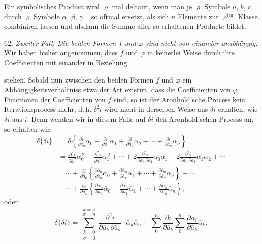 \documentclass[11pt]{article}
\providecommand{\weberpage}[1]{}
\begin{document}
\glqq Ein symbolisches Product wird $\varrho$ mal deltairt, wenn man je $\varrho$ Symbole $a$, $b$, $c\dots$ durch $\varrho$ Symbole $\alpha$, $\beta$, $\gamma\dots$ so oftmal ersetzt, als sich $n$ Elemente zur $\varrho^{\text{ten}}$ Klasse combiniren lassen und alsdann die Summe aller so erhaltenen Producte bildet.\grqq{}

62. \textit{Zweiter Fall: Die beiden Formen $f$ und $\varphi$ sind nicht von einander unabhängig.} Wir haben bisher angenommen, dass $f$ und $\varphi$ in keinerlei Weise durch ihre Coefficienten mit einander in Beziehung


\weberpage{67}
stehen. Sobald nun zwischen den beiden Formen $f$ und $\varphi$ ein Abhängigkeitsverhältniss etwa der Art existirt, dass die Coefficienten von $\varphi$ Functionen der Coefficienten von $f$ sind, so ist der Aronhold'sche Process kein Iterationsprocess mehr, d.\,h. $\delta^2 i$ wird nicht in derselben Weise aus $\delta i$ erhalten, wie $\delta i$ aus $i$. Denn wenden wir in diesem Falle auf $\delta i$ den Aronhold'schen Process an, so erhalten wir:
\[
\begin{aligned}
\delta\{\delta i\} &= \delta\left\{ \frac{\partial i}{\partial \bar a_0}\bar\alpha_0 + \frac{\partial i}{\partial \bar a_1}\bar\alpha_1 + \frac{\partial i}{\partial \bar a_2}\bar\alpha_2 + \cdots + \frac{\partial i}{\partial \bar a_n}\bar\alpha_n \right\}\\
&= \frac{\partial^2 i}{\partial \bar a_0^{\,2}}\bar\alpha_0^{\,2} + \frac{\partial^2 i}{\partial \bar a_1^{\,2}}\bar\alpha_1^{\,2} + \cdots + 2\frac{\partial^2 i}{\partial \bar a_0\,\partial \bar a_1}\bar\alpha_0\bar\alpha_1 + 2\frac{\partial^2 i}{\partial \bar a_0\,\partial \bar a_2}\bar\alpha_1\bar\alpha_2 + \cdots %
\\
&\quad \cdots + \frac{\partial i}{\partial \bar a_0} \left\{ \frac{\partial \bar\alpha_0}{\partial \bar a_0}\bar\alpha_0 + \frac{\partial \bar\alpha_0}{\partial \bar a_1}\bar\alpha_1 + \cdots + \frac{\partial \bar\alpha_0}{\partial \bar a_n}\bar\alpha_n \right\} + \cdots\\
&\quad \cdots + \frac{\partial i}{\partial \bar a_n} \left\{ \frac{\partial \bar\alpha_n}{\partial \bar a_0}\bar\alpha_0 + \frac{\partial \bar\alpha_n}{\partial \bar a_1}\bar\alpha_1 + \cdots + \frac{\partial \bar\alpha_n}{\partial \bar a_n}\bar\alpha_n \right\},
\end{aligned}
\]
oder
\[
\delta\{\delta i\} = \sum_{\substack{k=0\\ \sigma=0}}^{\substack{k=n\\ \sigma=n}} \frac{\partial^2 i}{\partial \bar a_k\,\partial \bar a_\sigma}\cdot \bar\alpha_k\bar\alpha_\sigma + \sum_0^n \frac{\partial i}{\partial \bar a_k}\sum_0^n \frac{\partial \bar\alpha_i}{\partial \bar a_k}\bar\alpha_k.
\]
\end{document}
